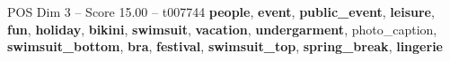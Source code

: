 \begin{textsample}{POS Dim 3 – Score 15.00 – t007744}  \label{ex:f3_pos_026}
\textbf{people}, \textbf{event}, \textbf{public\_event}, \textbf{leisure}, \textbf{fun}, \textbf{holiday}, \textbf{bikini}, \textbf{swimsuit}, \textbf{vacation}, \textbf{undergarment}, photo\_caption, \textbf{swimsuit\_bottom}, \textbf{bra}, \textbf{festival}, \textbf{swimsuit\_top}, \textbf{spring\_break}, \textbf{lingerie}

\end{textsample}
